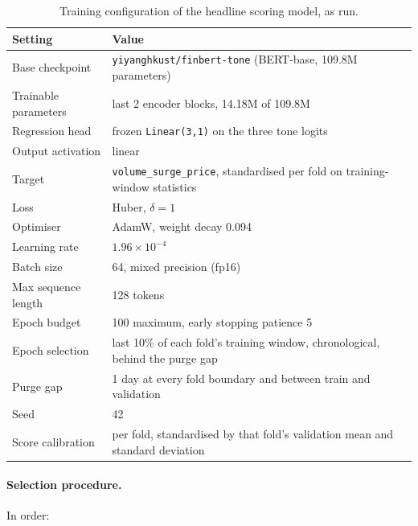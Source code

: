 \begin{table}[htbp]
\centering
\caption{Training configuration of the headline scoring model, as run.}
\label{tab:finbert_hparams}
\begin{tabular}{ll}
\hline
Setting & Value \\
\hline
        Base checkpoint & \texttt{yiyanghkust/finbert-tone} (BERT-base, 109.8M parameters) \\
        Trainable parameters & last 2 encoder blocks, 14.18M of 109.8M \\
        Regression head & frozen \texttt{Linear(3,1)} on the three tone logits \\
        Output activation & linear \\
        Target & \texttt{volume\_surge\_price}, standardised per fold on training-window statistics \\
        Loss & Huber, $\delta = 1$ \\
        Optimiser & AdamW, weight decay 0.094 \\
        Learning rate & $1.96\times10^{-4}$ \\
        Batch size & 64, mixed precision (fp16) \\
        Max sequence length & 128 tokens \\
        Epoch budget & 100 maximum, early stopping patience 5 \\
        Epoch selection & last 10\% of each fold's training window, chronological, behind the purge gap \\
        Purge gap & 1 day at every fold boundary and between train and validation \\
        Seed & 42 \\
        Score calibration & per fold, standardised by that fold's validation mean and standard deviation \\
\hline
\end{tabular}
\end{table}

\paragraph{Selection procedure.} In order:

